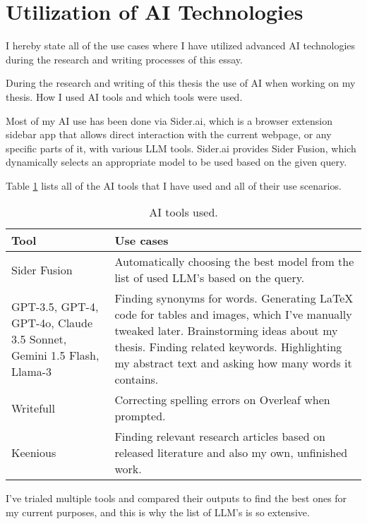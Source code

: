 
\chapter*{Utilization of AI Technologies\label{appendix:declaration}}

I hereby state all of the use cases where I have utilized advanced AI technologies during the research and writing processes of this essay.

During the research and writing of this thesis the use of AI when working on my thesis. How I used AI tools and which tools were used.

Most of my AI use has been done via Sider.ai, which is a browser extension sidebar app that allows direct interaction with the current webpage, or any specific parts of it, with various LLM tools. Sider.ai provides Sider Fusion, which dynamically selects an appropriate model to be used based on the given query.

Table \ref{tab:declaration} lists all of the AI tools that I have used and all of their use scenarios.

\begin{table}[h]
  \centering
  \begin{tabular}{m{5cm}m{8cm}}
    \hline
    \textbf{Tool} & \textbf{Use cases} \\
    \hline
    Sider Fusion & Automatically choosing the best model from the list of used LLM's based on the query. \\
    \hline
    GPT-3.5, GPT-4, GPT-4o, Claude 3.5 Sonnet, Gemini 1.5 Flash, Llama-3 & Finding synonyms for words. Generating LaTeX code for tables and images, which I’ve manually tweaked later. Brainstorming ideas about my thesis. Finding related keywords. Highlighting my abstract text and asking how many words it contains. \\
    \hline
    Writefull & Correcting spelling errors on Overleaf when prompted. \\
    \hline
    Keenious & Finding relevant research articles based on released literature and also my own, unfinished work. \\
    \hline
  \end{tabular}
  \caption{AI tools used.}
  \label{tab:declaration}
\end{table}

I've trialed multiple tools and compared their outputs to find the best ones for my current purposes, and this is why the list of LLM's is so extensive.